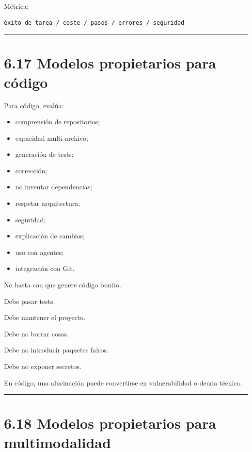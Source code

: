 Métrica:

\begin{lstlisting}
éxito de tarea / coste / pasos / errores / seguridad
\end{lstlisting}

\begin{center}\rule{0.5\linewidth}{0.5pt}\end{center}

\section{6.17 Modelos propietarios para
código}\label{modelos-propietarios-para-cuxf3digo}

Para código, evalúa:

\begin{itemize}
\tightlist
\item
  comprensión de repositorios;
\item
  capacidad multi-archivo;
\item
  generación de tests;
\item
  corrección;
\item
  no inventar dependencias;
\item
  respetar arquitectura;
\item
  seguridad;
\item
  explicación de cambios;
\item
  uso con agentes;
\item
  integración con Git.
\end{itemize}

No basta con que genere código bonito.

Debe pasar tests.

Debe mantener el proyecto.

Debe no borrar cosas.

Debe no introducir paquetes falsos.

Debe no exponer secretos.

En código, una alucinación puede convertirse en vulnerabilidad o deuda
técnica.

\begin{center}\rule{0.5\linewidth}{0.5pt}\end{center}

\section{6.18 Modelos propietarios para
multimodalidad}\label{modelos-propietarios-para-multimodalidad}

